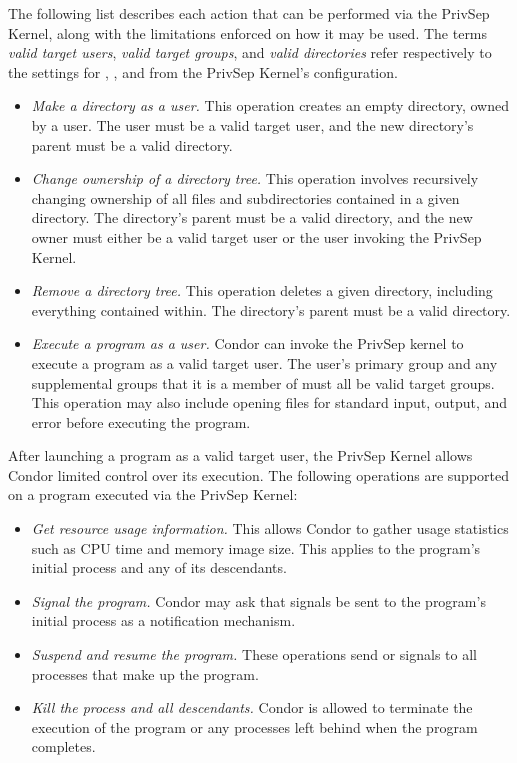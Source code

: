 The following list describes each action that can be performed via the
PrivSep Kernel, along with the limitations enforced on how it may be
used. The terms \emph{valid target users}, \emph{valid target groups},
and \emph{valid directories} refer respectively to the settings for
, , and
 from the PrivSep Kernel's configuration.

\begin{itemize}

\item \emph{Make a directory as a user.} This operation creates
an empty directory, owned by a user. The user must be a valid target
user, and the new directory's parent must be a valid directory.

\item \emph{Change ownership of a directory tree.} This operation
involves recursively changing ownership of all files and
subdirectories contained in a given directory. The directory's parent
must be a valid directory, and the new owner must either be a valid
target user or the user invoking the PrivSep Kernel.

\item \emph{Remove a directory tree.} This operation deletes a given directory,
including everything contained within. The directory's parent must be
a valid directory.

\item \emph{Execute a program as a user.} Condor can invoke the
PrivSep kernel to execute a program as a valid target user. The user's
primary group and any supplemental groups that it is a member of must
all be valid target groups. This operation may also include opening
files for standard input, output, and error before executing the
program.

\end{itemize}

After launching a program as a valid target user, the PrivSep Kernel
allows Condor limited control over its execution. The following
operations are supported on a program executed via the PrivSep Kernel:

\begin{itemize}

\item \emph{Get resource usage information.} This allows Condor to
gather usage statistics such as CPU time and memory image size. This
applies to the program's initial process and any of its descendants.

\item \emph{Signal the program.} Condor may ask that signals be sent
to the program's initial process as a notification mechanism.

\item \emph{Suspend and resume the program.} These operations send
 or  signals to all processes that make up
the program.

\item \emph{Kill the process and all descendants.} Condor is allowed
to terminate the execution of the program or any processes
left behind when the program completes.

\end{itemize}

